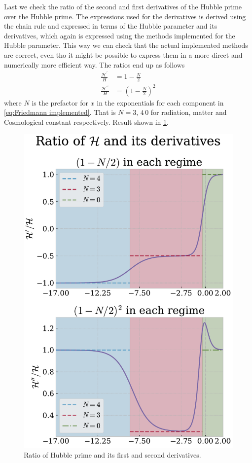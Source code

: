 \documentclass[10pt,a4paper]{article}
\begin{document}
\begin{appendices}
Last we check the ratio of the second and first derivatives of the Hubble prime over the Hubble prime. The expressions used for the derivatives is derived using the chain rule and expressed in terms of the Hubble parameter and its derivatives, which again is expressed using the methods implemented for the Hubble parameter. This way we can check that the actual implemented methods are correct, even tho it might be possible to express them in a more direct and numerically more efficient way. The ratios end up as follows
\begin{align*}
    \frac{\mathcal{H}^\prime}{H} &= 1-\frac{N}{2}
    \\
    \frac{\mathcal{H}^{\prime\prime}}{H} &= \left(1-\frac{N}{2}\right)^2
\end{align*}
where $N$ is the prefactor for $x$ in the exponentials for each component in \cref{eq:Friedmann implemented}. That is $N={3,\,4\,0}$ for radiation, matter and Cosmological constant respectively. Result shown in \cref{fig:bench_Hp_and_derivatives}.
\renewcommand{\floatpagefraction}{.99}%
\renewcommand{\textfraction}{0}
\begin{figure}[t]
    \centering
    \includegraphics[scale=0.5]{../figs/ratio_Hprime_and_derivatives.pdf}
    \caption{Ratio of Hubble prime and its first and second derivatives.}
    \label{fig:bench_Hp_and_derivatives}
\end{figure}


\end{appendices}
\end{document}
